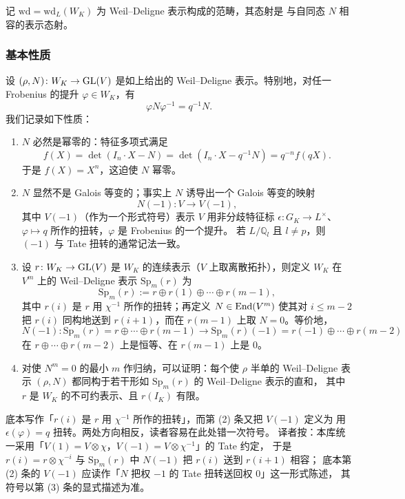 \begin{definition}
记 $\mathrm{wd}=\mathrm{wd}_L(W_K)$ 为 Weil--Deligne 表示构成的范畴，其态射是
与自同态 $N$ 相容的表示态射。
\end{definition}

\subsubsection{基本性质}

设 $(\rho,N)\colon W_K\to\mathrm{GL}(V)$ 是如上给出的 Weil--Deligne 表示。特别地，对任一
Frobenius 的提升 $\varphi\in W_K$，有
\[
\varphi N\varphi^{-1}=q^{-1}N .
\]
我们记录如下性质：

\begin{enumerate}[label=(\arabic*),leftmargin=2.2em]
\item $N$ 必然是幂零的：特征多项式满足
\[
f(X)=\det(I_n\cdot X-N)=\det(I_n\cdot X-q^{-1}N)=q^{-n}f(qX).
\]
于是 $f(X)=X^{n}$，这迫使 $N$ 幂零。

\item $N$ 显然不是 Galois 等变的；事实上 $N$ 诱导出一个 Galois 等变的映射
\[
N(-1)\colon V\longrightarrow V(-1),
\]
其中 $V(-1)$（作为一个形式符号）表示 $V$ 用非分歧特征标
$\epsilon\colon G_K\to L^{\times}$、$\varphi\mapsto q$ 所作的扭转，$\varphi$ 是 Frobenius 的一个提升。
若 $L/\mathbb{Q}_l$ 且 $l\neq p$，则 $(-1)$ 与 Tate 扭转的通常记法一致。

\item 设 $r\colon W_K\to\mathrm{GL}(V)$ 是 $W_K$ 的连续表示（$V$ 上取离散拓扑），则定义
$W_K$ 在 $V^{m}$ 上的 Weil--Deligne 表示 $\mathrm{Sp}_m(r)$ 为
\[
\mathrm{Sp}_m(r):=r\oplus r(1)\oplus\cdots\oplus r(m-1),
\]
其中 $r(i)$ 是 $r$ 用 $\chi^{-1}$ 所作的扭转；再定义 $N\in\mathrm{End}(V^{m})$ 使其对
$i\le m-2$ 把 $r(i)$ 同构地送到 $r(i+1)$，而在 $r(m-1)$ 上取 $N=0$。等价地，
\[
N(-1)\colon \mathrm{Sp}_m(r)=r\oplus\cdots\oplus r(m-1)\longrightarrow
\mathrm{Sp}_m(r)(-1)=r(-1)\oplus\cdots\oplus r(m-2)
\]
在 $r\oplus\cdots\oplus r(m-2)$ 上是恒等、在 $r(m-1)$ 上是 $0$。

\item 对使 $N^{m}=0$ 的最小 $m$ 作归纳，可以证明：每个使 $\rho$ 半单的
Weil--Deligne 表示 $(\rho,N)$ 都同构于若干形如 $\mathrm{Sp}_m(r)$ 的 Weil--Deligne 表示的直和，
其中 $r$ 是 $W_K$ 的不可约表示、且 $r(I_K)$ 有限。
\end{enumerate}

\begin{yizhu}[关于 $r(i)$ 的扭转方向]
底本写作「$r(i)$ 是 $r$ 用 $\chi^{-1}$ 所作的扭转」，而第 (2) 条又把 $V(-1)$ 定义为
用 $\epsilon(\varphi)=q$ 扭转。两处方向相反，读者容易在此处错一次符号。
译者按：本库统一采用「$V(1)=V\otimes\chi$，$V(-1)=V\otimes\chi^{-1}$」的 Tate 约定，
于是 $r(i)=r\otimes\chi^{-i}$ 与 $\mathrm{Sp}_m(r)$ 中 $N(-1)$ 把 $r(i)$ 送到 $r(i+1)$ 相容；
底本第 (2) 条的 $V(-1)$ 应读作「$N$ 把权 $-1$ 的 Tate 扭转送回权 $0$」这一形式陈述，
其符号以第 (3) 条的显式描述为准。
\end{yizhu}

